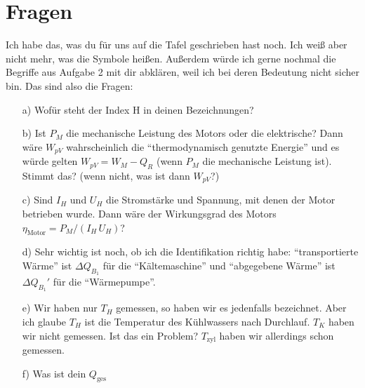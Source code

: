 \documentclass[a4paper, 12pt,]{scrartcl}
\begin{document}
\section{Fragen}
Ich habe das, was du für uns auf die Tafel geschrieben hast noch. Ich weiß aber nicht mehr, was die Symbole heißen.  Außerdem würde ich gerne nochmal die Begriffe aus Aufgabe 2 mit dir abklären, weil ich bei deren Bedeutung nicht sicher bin. Das sind also die Fragen:
\begin{itemize}
\item[a)]Wofür steht der Index H in deinen Bezeichnungen?

\item[b)]Ist $P_M$ die mechanische Leistung des Motors oder die elektrische? Dann wäre $W_{pV}$ wahrscheinlich die ``thermodynamisch genutzte Energie'' und es würde gelten $W_{pV}=W_M-Q_R$ (wenn $P_M$ die mechanische Leistung ist). Stimmt das? (wenn nicht, was ist dann $W_{pV}$?)

\item[c)]Sind $I_H$ und $U_H$ die Stromstärke und Spannung, mit denen der Motor betrieben wurde. Dann wäre der Wirkungsgrad des Motors $\eta_\text{Motor}=P_M/(I_H\,U_H)$?

\item[d)]Sehr wichtig ist noch, ob ich die Identifikation richtig habe: ``transportierte Wärme'' ist $\Delta{Q_{B_1}}$ für die ``Kältemaschine'' und ``abgegebene Wärme'' ist $\Delta{Q_{B_1}}'$ für die ``Wärmepumpe''.

\item[e)]Wir haben nur $T_H$ gemessen, so haben wir es jedenfalls bezeichnet. Aber ich glaube $T_H$ ist die Temperatur des Kühlwassers nach Durchlauf. $T_K$ haben wir nicht gemessen. Ist das ein Problem? $T_\text{zyl}$ haben wir allerdings schon gemessen.

\item[f)]Was ist dein $Q_\text{ges}$
 \end{itemize}
\end{document}

